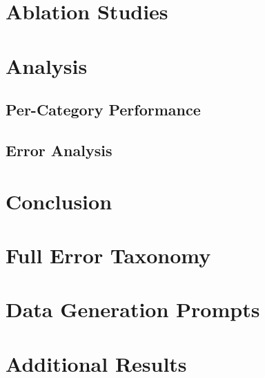 \documentclass[11pt]{article}
\begin{document}
\section{Ablation Studies}
\label{sec:ablation}


\section{Analysis}
\label{sec:analysis}

\subsection{Per-Category Performance}

\subsection{Error Analysis}

\section{Conclusion}
\label{sec:conclusion}





\appendix

\section{Full Error Taxonomy}
\label{app:taxonomy}

\section{Data Generation Prompts}
\label{app:prompts}

\section{Additional Results}
\label{app:results}
\end{document}
